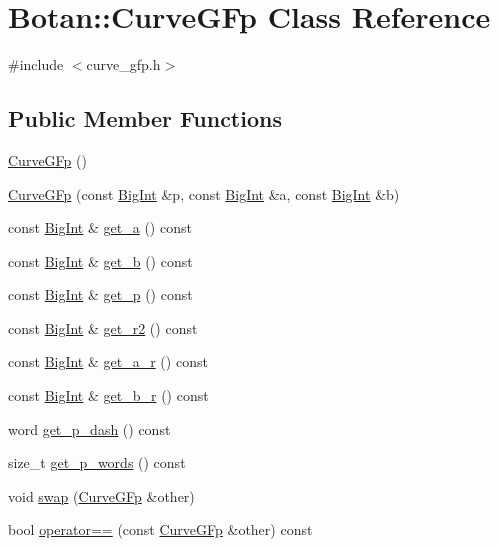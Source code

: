 \hypertarget{classBotan_1_1CurveGFp}{\section{Botan\-:\-:Curve\-G\-Fp Class Reference}
\label{classBotan_1_1CurveGFp}
}


{\ttfamily \#include $<$curve\-\_\-gfp.\-h$>$}

\subsection*{Public Member Functions}
\begin{DoxyCompactItemize}
\item 
\hyperlink{classBotan_1_1CurveGFp_ae43245ae3e46b9069e4f0c6218db9775}{Curve\-G\-Fp} ()
\item 
\hyperlink{classBotan_1_1CurveGFp_aaeb72bf32cd4e5169be11094c244f92b}{Curve\-G\-Fp} (const \hyperlink{classBotan_1_1BigInt}{Big\-Int} \&p, const \hyperlink{classBotan_1_1BigInt}{Big\-Int} \&a, const \hyperlink{classBotan_1_1BigInt}{Big\-Int} \&b)
\item 
const \hyperlink{classBotan_1_1BigInt}{Big\-Int} \& \hyperlink{classBotan_1_1CurveGFp_a0f0d8b5ae722ef7bfccbe86fa1ca156d}{get\-\_\-a} () const 
\item 
const \hyperlink{classBotan_1_1BigInt}{Big\-Int} \& \hyperlink{classBotan_1_1CurveGFp_abd0c2bdae40f90d825ea7be6c3f4cd97}{get\-\_\-b} () const 
\item 
const \hyperlink{classBotan_1_1BigInt}{Big\-Int} \& \hyperlink{classBotan_1_1CurveGFp_a08b093db6d5b58124fa75ca56d7663d2}{get\-\_\-p} () const 
\item 
const \hyperlink{classBotan_1_1BigInt}{Big\-Int} \& \hyperlink{classBotan_1_1CurveGFp_a03006c36f79432596efbd0ef79323d3a}{get\-\_\-r2} () const 
\item 
const \hyperlink{classBotan_1_1BigInt}{Big\-Int} \& \hyperlink{classBotan_1_1CurveGFp_af2400431093f55f431d7e9b839fdbd27}{get\-\_\-a\-\_\-r} () const 
\item 
const \hyperlink{classBotan_1_1BigInt}{Big\-Int} \& \hyperlink{classBotan_1_1CurveGFp_a6a9773e1662d3bd5aad77d642af32ac2}{get\-\_\-b\-\_\-r} () const 
\item 
word \hyperlink{classBotan_1_1CurveGFp_a08faa65c34ce26da6335eded44c9bfae}{get\-\_\-p\-\_\-dash} () const 
\item 
size\-\_\-t \hyperlink{classBotan_1_1CurveGFp_a2dbb1f75143c7c417fadc70452c0b906}{get\-\_\-p\-\_\-words} () const 
\item 
void \hyperlink{classBotan_1_1CurveGFp_a58953b2563d8c6a59cd146820a83b13e}{swap} (\hyperlink{classBotan_1_1CurveGFp}{Curve\-G\-Fp} \&other)
\item 
bool \hyperlink{classBotan_1_1CurveGFp_a46ab6d256aaf77f5ebd3112382aaa6a4}{operator==} (const \hyperlink{classBotan_1_1CurveGFp}{Curve\-G\-Fp} \&other) const 
\end{DoxyCompactItemize}


